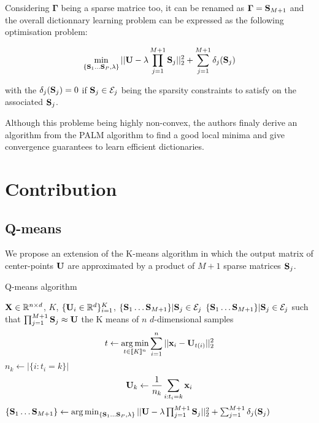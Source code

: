 \documentclass{article}
\def\rmGamma{{\mathbf{\Gamma}}}
\begin{document}
Considering $\rmGamma$ being a sparse matrice too, it can be renamed as $\rmGamma = \rmS_{M+1}$ and the overall dictionnary learning problem can be expressed as the following optimisation problem:

\begin{equation}
\min_{\{{\mathbf{S}}_1 \dots {\mathbf{S}}_P, \lambda\}} ||{\mathbf{U}} - \lambda \prod_{j=1}^{M+1}{{\mathbf{S}}_j}||_2^2 + \sum_{j=1}^{M+1} \delta_j({\mathbf{S}}_j)
\end{equation}

with the $\delta_j({\mathbf{S}}_j) = 0$ if ${\mathbf{S}}_j \in \mathcal{E}_j$ being the sparsity constraints to satisfy on the associated ${\mathbf{S}}_j$.

Although this probleme being highly non-convex, the authors finaly derive an algorithm from the PALM algorithm \cite{bolte2014proximal} to find a good local minima and give convergence guarantees to learn efficient dictionaries.


\section{Contribution}

\subsection{Q-means}

We propose an extension of the K-means algorithm in which the output matrix of center-points ${\mathbf{U}}$ are approximated by a product of $M+1$ sparse matrices ${\mathbf{S}}_j$. 

\begin{algorithm}
\caption{Q-means algorithm}
\begin{algorithmic}


\REQUIRE ${\mathbf{X}} \in \mathbb{R}^{n \times d}$, $K$, $\{{\mathbf{U}}_i \in \mathbb{R}^d\}_{i=1}^{K}$, $\{{\mathbf{S}}_1 \dots {\mathbf{S}}_{M+1}\}|{\mathbf{S}}_j \in \mathcal{E}_j$
\ENSURE $\{{\mathbf{S}}_1 \dots {\mathbf{S}}_{M+1}\}|{\mathbf{S}}_j \in \mathcal{E}_j$ such that $\prod_{j=1}^{M+1}{\mathbf{S}}_j \approx {\mathbf{U}}$ the K means of $n$ $d$-dimensional samples
\REPEAT
\STATE \begin{equation}
t \leftarrow \operatorname*{arg\,min}_{t \in [\![K]\!]^n} \sum_{i=1}^{n} {||{\mathbf{x}}_i - {\mathbf{U}}_{t(i)}||_2^2}
\end{equation}
\STATE $n_k \leftarrow |\{i: t_i=k\}|$
\STATE \begin{equation}
{\mathbf{U}}_k \leftarrow \frac{1}{n_k} \sum_{i: t_i = k} {{\mathbf{x}}_i}
\end{equation}
\STATE $\{{\mathbf{S}}_1 \dots {\mathbf{S}}_{M+1}\} \leftarrow \operatorname*{arg\,min}_{\{{\mathbf{S}}_1 \dots {\mathbf{S}}_P, \lambda\}} ||{\mathbf{U}} - \lambda \prod_{j=1}^{M+1}{{\mathbf{S}}_j}||_2^2 + \sum_{j=1}^{M+1} \delta_j({\mathbf{S}}_j)$
\ENDFOR
{}
\end{algorithmic}
\end{algorithm}
\end{document}
